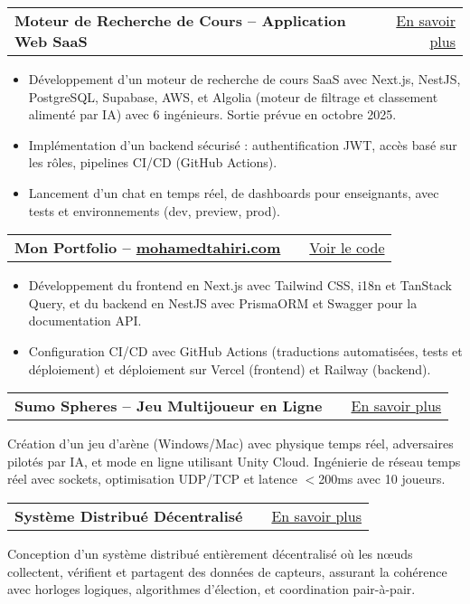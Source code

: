 \documentclass[a4paper,10pt]{article}
\makeatletter
\newenvironment{jobshort}[2]
    {
    \begin{tabularx}{\linewidth}{@{}l X r@{}}
    \textbf{#1} & \hfill &  #2 \\[2pt]
    \end{tabularx}
    } {}
\newenvironment{joblong}[2]
    {
    \begin{tabularx}{\linewidth}{@{}l X r@{}}
    \textbf{#1} & \hfill &  #2 \\[2pt]
    \end{tabularx}
    \begin{minipage}[t]{\linewidth}
    \begin{itemize}[nosep,after=\strut, leftmargin=1em, itemsep=3pt,label=--]
    }
    {
    \end{itemize}
    \end{minipage}    
    }
\makeatother
\begin{document}
\begin{joblong}{Moteur de Recherche de Cours – Application Web SaaS}{\href{https://mohamedtahiri.com/projects/my-biggest-project}{En savoir plus}}
    \item Développement d'un moteur de recherche de cours SaaS avec Next.js, NestJS, PostgreSQL, Supabase, AWS, et Algolia (moteur de filtrage et classement alimenté par IA) avec 6 ingénieurs. Sortie prévue en octobre 2025.
    \item Implémentation d'un backend sécurisé : authentification JWT, accès basé sur les rôles, pipelines CI/CD (GitHub Actions).
    \item Lancement d'un chat en temps réel, de dashboards pour enseignants, avec tests et environnements (dev, preview, prod).
\end{joblong}
\begin{joblong}{Mon Portfolio – \href{https://mohamedtahiri.com}{mohamedtahiri.com}}{\href{https://github.com/moha-tah/portfolio}{Voir le code}}
    \item Développement du frontend en Next.js avec Tailwind CSS, i18n et TanStack Query, et du backend en NestJS avec PrismaORM et Swagger pour la documentation API.
    \item Configuration CI/CD avec GitHub Actions (traductions automatisées, tests et déploiement) et déploiement sur Vercel (frontend) et Railway (backend).
\end{joblong}

\begin{jobshort}{Sumo Spheres – Jeu Multijoueur en Ligne}{\href{https://mohamedtahiri.com/projects/online-multiplayer-game}{En savoir plus}}
    Création d'un jeu d'arène (Windows/Mac) avec physique temps réel, adversaires pilotés par IA, et mode en ligne utilisant Unity Cloud. Ingénierie de réseau temps réel avec sockets, optimisation UDP/TCP et latence $<$200ms avec 10 joueurs.
\end{jobshort}

\begin{jobshort}{Système Distribué Décentralisé}{\href{https://mohamedtahiri.com/projects/decentralized-distributed-system}{En savoir plus}}
    Conception d'un système distribué entièrement décentralisé où les nœuds collectent, vérifient et partagent des données de capteurs, assurant la cohérence avec horloges logiques, algorithmes d'élection, et coordination pair-à-pair.
\end{jobshort}

\end{document}
